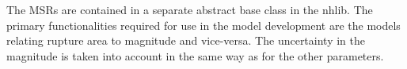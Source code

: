 The MSRs are contained in a separate abstract base class in the nhlib. The primary functionalities required for use in the model development are the models relating rupture area to magnitude and vice-versa. The uncertainty in the magnitude is taken into account in the same way as for the other parameters.